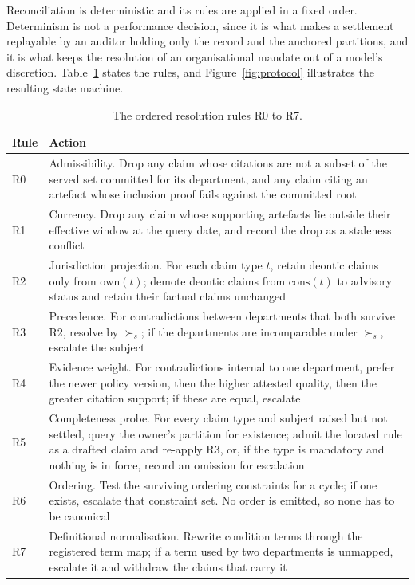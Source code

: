 \documentclass[journal]{IEEEtran}
\begin{document}
Reconciliation is deterministic and its rules are applied in a fixed order. Determinism is not a performance decision, since it is what makes a settlement replayable by an auditor holding only the record and the anchored partitions, and it is what keeps the resolution of an organisational mandate out of a model's discretion. Table~\ref{tab:rules} states the rules, and Figure~\ref{fig:protocol} illustrates the resulting state machine.

\begin{table}[!t]
\centering
\caption{The ordered resolution rules R0 to R7.}
\label{tab:rules}
\footnotesize
\begin{tabular}{@{}>{\raggedright\arraybackslash}p{}>{\raggedright\arraybackslash}p{}@{}}
\toprule
Rule & Action \\
\midrule
R0 & Admissibility. Drop any claim whose citations are not a subset of the served set committed for its department, and any claim citing an artefact whose inclusion proof fails against the committed root \\
R1 & Currency. Drop any claim whose supporting artefacts lie outside their effective window at the query date, and record the drop as a staleness conflict \\
R2 & Jurisdiction projection. For each claim type $t$, retain deontic claims only from $\mathrm{own}(t)$; demote deontic claims from $\mathrm{cons}(t)$ to advisory status and retain their factual claims unchanged \\
R3 & Precedence. For contradictions between departments that both survive R2, resolve by $\succ_s$; if the departments are incomparable under $\succ_s$, escalate the subject \\
R4 & Evidence weight. For contradictions internal to one department, prefer the newer policy version, then the higher attested quality, then the greater citation support; if these are equal, escalate \\
R5 & Completeness probe. For every claim type and subject raised but not settled, query the owner's partition for existence; admit the located rule as a drafted claim and re-apply R3, or, if the type is mandatory and nothing is in force, record an omission for escalation \\
R6 & Ordering. Test the surviving ordering constraints for a cycle; if one exists, escalate that constraint set. No order is emitted, so none has to be canonical \\
R7 & Definitional normalisation. Rewrite condition terms through the registered term map; if a term used by two departments is unmapped, escalate it and withdraw the claims that carry it \\
\bottomrule
\end{tabular}
\end{table}
\end{document}
